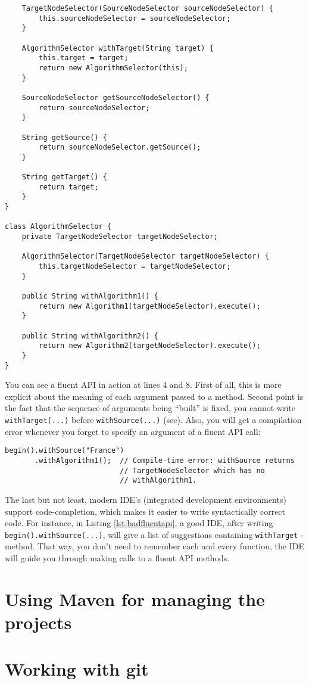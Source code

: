 \documentclass[oneside]{book}
\begin{document}
\begin{lstlisting}
    TargetNodeSelector(SourceNodeSelector sourceNodeSelector) {
        this.sourceNodeSelector = sourceNodeSelector;
    }
    
    AlgorithmSelector withTarget(String target) {
        this.target = target;
        return new AlgorithmSelector(this);
    }
    
    SourceNodeSelector getSourceNodeSelector() {
        return sourceNodeSelector;
    }
    
    String getSource() {
        return sourceNodeSelector.getSource();
    }
    
    String getTarget() {
        return target;
    }
}

class AlgorithmSelector {
    private TargetNodeSelector targetNodeSelector;
    
    AlgorithmSelector(TargetNodeSelector targetNodeSelector) {
        this.targetNodeSelector = targetNodeSelector;
    } 
    
    public String withAlgorithm1() {
        return new Algorithm1(targetNodeSelector).execute();
    }
    
    public String withAlgorithm2() {
        return new Algorithm2(targetNodeSelector).execute();
    }
}
\end{lstlisting}
You can see a fluent API in action at lines 4 and 8. First of all, this is more explicit about the meaning of each argument passed to a method. Second point is the fact that the sequence of arguments being ``built'' is fixed, you cannot write \texttt{withTarget(...)} before \texttt{withSource(...)} (see). Also, you will get a compilation error whenever you forget to specify an argument of a fluent API call:
\newpage
\lstset{
numbers=none
}
\begin{lstlisting}[caption={Bad fluent API call},label=lst:badfluentapi]
begin().withSource("France")
       .withAlgorithm1();  // Compile-time error: withSource returns 
                           // TargetNodeSelector which has no 
                           // withAlgorithm1.
\end{lstlisting}
The last but not least, modern IDE's (integrated development environments) support code-completion, which makes it easier to write syntactically correct code. For instance, in Listing \ref{lst:badfluentapi}, a good IDE, after writing \\ \texttt{begin().withSource(...)}, will give a list of suggestions containing \texttt{withTarget} - method. That way, you don't need to remember each and every function, the IDE will guide you through making calls to a fluent API methods.

\section{Using Maven for managing the projects}

\section{Working with git}
\end{document}
